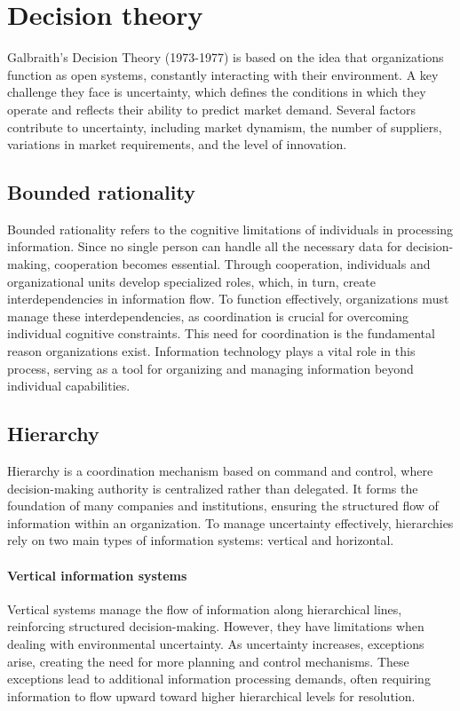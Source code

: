 \section{Decision theory}

Galbraith's Decision Theory (1973-1977) is based on the idea that organizations function as open systems, constantly interacting with their environment. 
A key challenge they face is uncertainty, which defines the conditions in which they operate and reflects their ability to predict market demand. 
Several factors contribute to uncertainty, including market dynamism, the number of suppliers, variations in market requirements, and the level of innovation.

\subsection{Bounded rationality}
Bounded rationality refers to the cognitive limitations of individuals in processing information. 
Since no single person can handle all the necessary data for decision-making, cooperation becomes essential. 
Through cooperation, individuals and organizational units develop specialized roles, which, in turn, create interdependencies in information flow. 
To function effectively, organizations must manage these interdependencies, as coordination is crucial for overcoming individual cognitive constraints. 
This need for coordination is the fundamental reason organizations exist. 
Information technology plays a vital role in this process, serving as a tool for organizing and managing information beyond individual capabilities.

\subsection{Hierarchy}
Hierarchy is a coordination mechanism based on command and control, where decision-making authority is centralized rather than delegated. 
It forms the foundation of many companies and institutions, ensuring the structured flow of information within an organization. 
To manage uncertainty effectively, hierarchies rely on two main types of information systems: vertical and horizontal.

\paragraph*{Vertical information systems}
Vertical systems manage the flow of information along hierarchical lines, reinforcing structured decision-making. 
However, they have limitations when dealing with environmental uncertainty. 
As uncertainty increases, exceptions arise, creating the need for more planning and control mechanisms. 
These exceptions lead to additional information processing demands, often requiring information to flow upward toward higher hierarchical levels for resolution.

